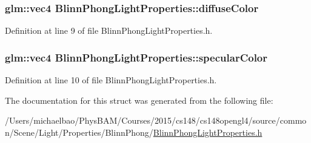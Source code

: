 \subsubsection[{diffuse\+Color}]{\setlength{\rightskip}{0pt plus 5cm}glm\+::vec4 Blinn\+Phong\+Light\+Properties\+::diffuse\+Color}\label{struct_blinn_phong_light_properties_aa12c81d848d370b8f79c9384d9fafec0}


Definition at line 9 of file Blinn\+Phong\+Light\+Properties.\+h.

\hypertarget{struct_blinn_phong_light_properties_a815238c4f235333affb85f949ff8df06}{}
\subsubsection[{specular\+Color}]{\setlength{\rightskip}{0pt plus 5cm}glm\+::vec4 Blinn\+Phong\+Light\+Properties\+::specular\+Color}\label{struct_blinn_phong_light_properties_a815238c4f235333affb85f949ff8df06}


Definition at line 10 of file Blinn\+Phong\+Light\+Properties.\+h.



The documentation for this struct was generated from the following file\+:\begin{DoxyCompactItemize}
\item 
/\+Users/michaelbao/\+Phys\+B\+A\+M/\+Courses/2015/cs148/cs148opengl4/source/common/\+Scene/\+Light/\+Properties/\+Blinn\+Phong/\hyperlink{_blinn_phong_light_properties_8h}{Blinn\+Phong\+Light\+Properties.\+h}\end{DoxyCompactItemize}

